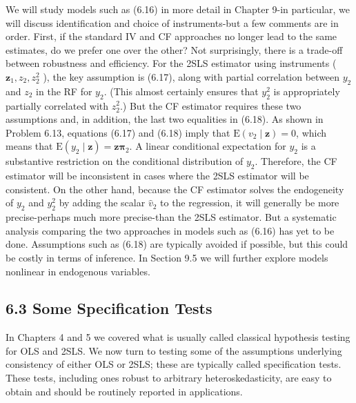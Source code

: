 \documentclass[10pt]{article}
\begin{document}
We will study models such as (6.16) in more detail in Chapter 9-in particular, we will discuss identification and choice of instruments-but a few comments are in order. First, if the standard IV and CF approaches no longer lead to the same estimates, do we prefer one over the other? Not surprisingly, there is a trade-off between robustness and efficiency. For the 2SLS estimator using instruments ( $\mathbf{z}_{1}, z_{2}, z_{2}^{2}$ ), the key assumption is (6.17), along with partial correlation between $y_{2}$ and $z_{2}$ in the RF for $y_{2}$. (This almost certainly ensures that $y_{2}^{2}$ is appropriately partially correlated with $z_{2}^{2}$.) But the CF estimator requires these two assumptions and, in addition, the last two equalities in (6.18). As shown in Problem 6.13, equations (6.17) and (6.18) imply that $\mathrm{E}\left(v_{2} \mid \mathbf{z}\right)=0$, which means that $\mathrm{E}\left(y_{2} \mid \mathbf{z}\right)=\mathbf{z} \boldsymbol{\pi}_{2}$. A linear conditional expectation for $y_{2}$ is a substantive restriction on the conditional distribution of $y_{2}$. Therefore, the CF estimator will be inconsistent in cases where the 2SLS estimator will be consistent. On the other hand, because the CF estimator solves the endogeneity of $y_{2}$ and $y_{2}^{2}$ by adding the scalar $\hat{v}_{2}$ to the regression, it will generally be more precise-perhaps much more precise-than the 2SLS estimator. But a systematic analysis comparing the two approaches in models such as (6.16) has yet to be done. Assumptions such as (6.18) are typically avoided if possible, but this could be costly in terms of inference. In Section 9.5 we will further explore models nonlinear in endogenous variables.

\subsection*{6.3 Some Specification Tests}
In Chapters 4 and 5 we covered what is usually called classical hypothesis testing for OLS and 2SLS. We now turn to testing some of the assumptions underlying consistency of either OLS or 2SLS; these are typically called specification tests. These tests, including ones robust to arbitrary heteroskedasticity, are easy to obtain and should be routinely reported in applications.
\end{document}
